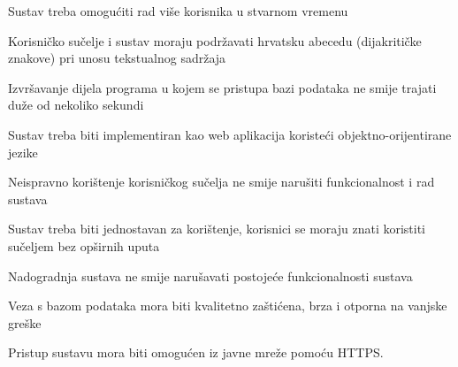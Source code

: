			\begin{packed_item}
				\item Sustav treba omogućiti rad više korisnika u stvarnom vremenu 
				\item Korisničko sučelje i sustav moraju podržavati hrvatsku abecedu (dijakritičke znakove) pri unosu tekstualnog sadržaja
				\item Izvršavanje dijela programa u kojem se pristupa bazi podataka ne smije trajati duže od nekoliko sekundi
				\item Sustav treba biti implementiran kao web aplikacija koristeći objektno-orijentirane jezike
				\item Neispravno korištenje korisničkog sučelja ne smije narušiti funkcionalnost i rad sustava
				\item Sustav treba biti jednostavan za korištenje, korisnici se moraju znati koristiti sučeljem bez opširnih uputa
				\item Nadogradnja sustava ne smije narušavati postojeće funkcionalnosti sustava
				\item Veza s bazom podataka mora biti kvalitetno zaštićena, brza i otporna na vanjske greške
				\item Pristup sustavu mora biti omogućen iz javne mreže pomoću HTTPS.
			\end{packed_item}
			 
			 
			 
	